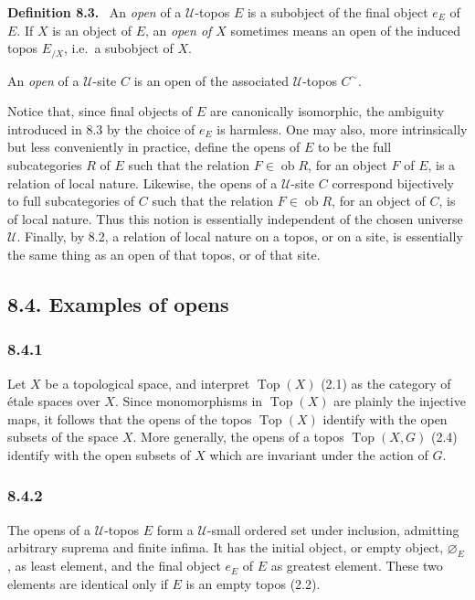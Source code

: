 \documentclass[11pt]{article}
\newcommand{\U}{\mathcal{U}}
\newcommand{\Top}{\operatorname{Top}}
\newcommand{\ie}{i.e.}
\newenvironment{statement}[1]{\par\medskip\noindent\textbf{#1.}\ }{\par\medskip}
\providecommand{\ob}{\operatorname{ob}}
\begin{document}
\begin{statement}{Definition 8.3}
An \emph{open} of a \(\U\)-topos \(E\) is a subobject of the final object \(e_E\) of \(E\). If \(X\) is an object of \(E\), an \emph{open of \(X\)} sometimes means an open of the induced topos \(E_{/X}\), \ie\ a subobject of \(X\).

An \emph{open} of a \(\U\)-site \(C\) is an open of the associated \(\U\)-topos \(C^{\sim}\).
\end{statement}

Notice that, since final objects of \(E\) are canonically isomorphic, the ambiguity introduced in 8.3 by the choice of \(e_E\) is harmless. One may also, more intrinsically but less conveniently in practice, define the opens of \(E\) to be the full subcategories \(R\) of \(E\) such that the relation \(F\in\ob R\), for an object \(F\) of \(E\), is a relation of local nature. Likewise, the opens of a \(\U\)-site \(C\) correspond bijectively to full subcategories of \(C\) such that the relation \(F\in\ob R\), for an object of \(C\), is of local nature. Thus this notion is essentially independent of the chosen universe \(\U\). Finally, by 8.2, a relation of local nature on a topos, or on a site, is essentially the same thing as an open of that topos, or of that site.

\subsection*{8.4. Examples of opens}

\subsubsection*{8.4.1}
Let \(X\) be a topological space, and interpret \(\Top(X)\) (2.1) as the category of \'{e}tale spaces over \(X\). Since monomorphisms in \(\Top(X)\) are plainly the injective maps, it follows that the opens of the topos \(\Top(X)\) identify with the open subsets of the space \(X\). More generally, the opens of a topos \(\Top(X,G)\) (2.4) identify with the open subsets of \(X\) which are invariant under the action of \(G\).

\subsubsection*{8.4.2}
The opens of a \(\U\)-topos \(E\) form a \(\U\)-small ordered set under inclusion, admitting arbitrary suprema and finite infima. It has the initial object, or empty object, \(\varnothing_E\), as least element, and the final object \(e_E\) of \(E\) as greatest element. These two elements are identical only if \(E\) is an empty topos (2.2).
\end{document}
